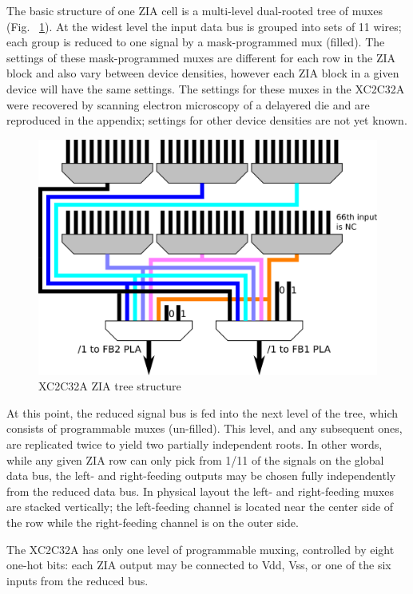 \documentclass[pdftex,letterpaper]{article}
\begin{document}
The basic structure of one ZIA cell is a multi-level dual-rooted tree of muxes (Fig. ~\ref {xc2c32a-zia-tree}). At 
the widest level the input data bus is grouped into sets of 11 wires; each group is reduced to one signal by a 
mask-programmed mux (filled). The settings of these mask-programmed muxes are different for each row in the ZIA 
block and also vary between device densities, however each ZIA block in a given device will have the same settings. 
The settings for these muxes in the XC2C32A were recovered by scanning electron microscopy of a delayered die and 
are reproduced in the appendix; settings for other device densities are not yet known.

\begin{figure}[h]
	\includegraphics[scale=1]{xc2c32a-zia-tree.png}
	\caption{XC2C32A ZIA tree structure}
	\label{xc2c32a-zia-tree}
\end{figure}

At this point, the reduced signal bus is fed into the next level of the tree, which consists of programmable muxes 
(un-filled). This level, and any subsequent ones, are replicated twice to yield two partially independent roots. In 
other words, while any given ZIA row can only pick from 1/11 of the signals on the global data bus, the left- and 
right-feeding outputs may be chosen fully independently from the reduced data bus. In physical layout the left- and 
right-feeding muxes are stacked vertically; the left-feeding channel is located near the center side of the row 
while the right-feeding channel is on the outer side.

The XC2C32A has only one level of programmable muxing, controlled by eight one-hot bits: each ZIA output may be 
connected to Vdd, Vss, or one of the six inputs from the reduced bus.
\end{document}
